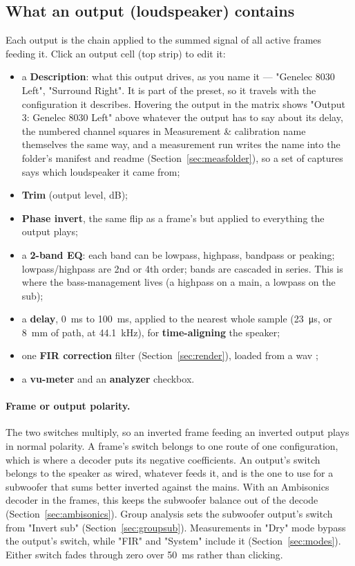\subsection{What an output (loudspeaker) contains}\label{sec:outputchain}
Each output is the chain applied to the summed signal of all active frames feeding it. Click an output cell (top strip) to edit it:
\begin{itemize}[nosep]
  \item a \textbf{Description}: what this output drives, as you name it --- "Genelec 8030 Left", "Surround Right". It is part of the preset, so it travels with the configuration it describes. Hovering the output in the matrix shows "Output 3: Genelec 8030 Left" above whatever the output has to say about its delay, the numbered channel squares in Measurement \& calibration name themselves the same way, and a measurement run writes the name into the folder's manifest and readme (Section~\ref{sec:measfolder}), so a set of captures says which loudspeaker it came from;
  \item \textbf{Trim} (output level, dB);
  \item \textbf{Phase invert}, the same flip as a frame's but applied to everything the output plays;
  \item a \textbf{2-band EQ}: each band can be lowpass, highpass, bandpass or peaking; lowpass/highpass are 2nd or 4th order; bands are cascaded in series. This is where the bass-management  lives (a highpass on a main, a lowpass on the sub);
  \item a \textbf{delay}, \SI{0}{\milli\second} to \SI{100}{\milli\second}, applied to the nearest whole sample (\SI{23}{\micro\second}, or \SI{8}{\milli\metre} of path, at \SI{44.1}{\kilo\hertz}), for \textbf{time-aligning} the speaker;
  \item one \textbf{FIR correction} filter (Section~\ref{sec:render}), loaded from a wav ;
  \item a \textbf{vu-meter} and an \textbf{analyzer} checkbox.
\end{itemize}

\paragraph{Frame or output polarity.} The two switches multiply, so an inverted frame feeding an inverted output plays in normal polarity. A frame's switch belongs to one route of one configuration, which is where a decoder puts its negative coefficients. An output's switch belongs to the speaker as wired, whatever feeds it, and is the one to use for a subwoofer that sums better inverted against the mains. With an Ambisonics decoder in the frames, this keeps the subwoofer balance out of the decode (Section~\ref{sec:ambisonics}). Group analysis sets the subwoofer output's switch from "Invert sub" (Section~\ref{sec:groupsub}). Measurements in "Dry" mode bypass the output's switch, while "FIR" and "System" include it (Section~\ref{sec:modes}). Either switch fades through zero over \SI{50}{\milli\second} rather than clicking.

